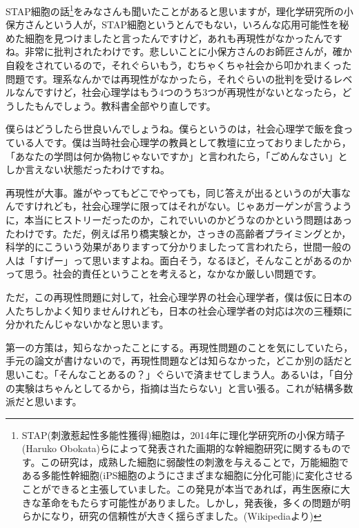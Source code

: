 \documentclass{ltjsbook}
\begin{document}
STAP細胞の話\footnote{STAP(刺激惹起性多能性獲得)細胞は，2014年に理化学研究所の小保方晴子(Haruko Obokata)らによって発表された画期的な幹細胞研究に関するものです。この研究は，成熟した細胞に弱酸性の刺激を与えることで，万能細胞である多能性幹細胞(iPS細胞のようにさまざまな細胞に分化可能)に変化させることができると主張していました。この発見が本当であれば，再生医療に大きな革命をもたらす可能性がありました。しかし，発表後，多くの問題が明らかになり，研究の信頼性が大きく揺らぎました。(Wikipediaより)}をみなさんも聞いたことがあると思いますが，理化学研究所の小保方さんという人が，STAP細胞というとんでもない，いろんな応用可能性を秘めた細胞を見つけましたと言ったんですけど，あれも再現性がなかったんですね。非常に批判されたわけです。悲しいことに小保方さんのお師匠さんが，確か自殺をされているので，それぐらいもう，むちゃくちゃ社会から叩かれまくった問題です。理系なんかでは再現性がなかったら，それぐらいの批判を受けるレベルなんですけど，社会心理学はもう4つのうち3つが再現性がないとなったら，どうしたもんでしょう。教科書全部やり直しです。

僕らはどうしたら世良いんでしょうね。僕らというのは，社会心理学で飯を食っている人です。僕は当時社会心理学の教員として教壇に立っておりましたから，「あなたの学問は何か偽物じゃないですか」と言われたら，「ごめんなさい」としか言えない状態だったわけですね。

再現性が大事。誰がやってもどこでやっても，同じ答えが出るというのが大事なんですけれども，社会心理学に限ってはそれがない。じゃあガーゲンが言うように，本当にヒストリーだったのか，これでいいのかどうなのかという問題はあったわけです。ただ，例えば吊り橋実験とか，さっきの高齢者プライミングとか，科学的にこういう効果がありますって分かりましたって言われたら，世間一般の人は「すげー」って思いますよね。面白そう，なるほど，そんなことがあるのかって思う。社会的責任ということを考えると，なかなか厳しい問題です。

ただ，この再現性問題に対して，社会心理学界の社会心理学者，僕は仮に日本の人たちしかよく知りませんけれども，日本の社会心理学者の対応は次の三種類に分かれたんじゃないかなと思います。

第一の方策は，知らなかったことにする。再現性問題のことを気にしていたら，手元の論文が書けないので，再現性問題などは知らなかった，どこか別の話だと思いこむ。「そんなことあるの？」ぐらいで済ませてしまう人。あるいは，「自分の実験はちゃんとしてるから，指摘は当たらない」と言い張る。これが結構多数派だと思います。
\end{document}

